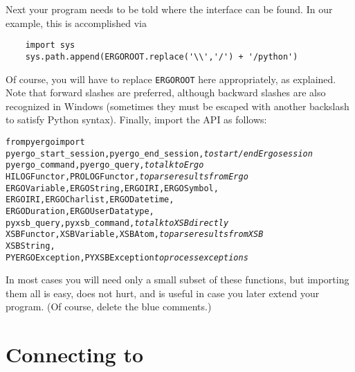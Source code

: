 Next your program needs to be told where the interface can be found. In our
example, this is accomplished via
\begin{verbatim}
    import sys
    sys.path.append(ERGOROOT.replace('\\','/') + '/python')
\end{verbatim}
Of course, you will have to replace \texttt{ERGOROOT} here appropriately,
as explained.
Note that forward slashes are preferred, although backward slashes are also
recognized in Windows (sometimes they must be escaped with another
backslash to satisfy Python syntax).
Finally, import the API as follows:
\begin{alltt}
from pyergo import \bs
    pyergo_start_session, pyergo_end_session, \bs  \emph{\color{blue}to start/end Ergo session}
    pyergo_command, pyergo_query,            \bs   \emph{\color{blue}to talk to Ergo}
    HILOGFunctor, PROLOGFunctor,             \bs   \emph{\color{blue}to parse results from Ergo}
    ERGOVariable, ERGOString, ERGOIRI, ERGOSymbol, \bs
    ERGOIRI, ERGOCharlist, ERGODatetime,     \bs
    ERGODuration, ERGOUserDatatype,          \bs
    pyxsb_query, pyxsb_command,              \bs   \emph{\color{blue}to talk to XSB directly}
    XSBFunctor, XSBVariable, XSBAtom,        \bs   \emph{\color{blue}to parse results from XSB}
    XSBString,                               \bs
    PYERGOException, PYXSBException              \emph{\color{blue}to process exceptions}
\end{alltt}
In most cases you will need only a small subset of these functions, but
importing them all is easy, does not hurt,
and is useful in case you later extend your program.
(Of course, delete the blue comments.)

\section{Connecting to \ERGO}

